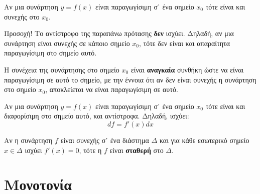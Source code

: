 \begin{prop}
  Αν μια συνάρτηση $ y=f(x) $ είναι παραγωγίσιμη σ᾽ ένα σημείο $ x_{0} $ τότε είναι 
  και συνεχής στο $ x_{0} $.
\end{prop}

\begin{rem}
\item{}
  \begin{myitemize}
    \item Προσοχή! Το αντίστροφο της παραπάνω πρότασης \textbf{δεν} ισχύει. 
      Δηλαδή, αν μια συνάρτηση είναι συνεχής σε κάποιο σημείο $ x_{0} $, 
      τότε δεν είναι και απαραίτητα παραγωγίσιμη στο σημείο αυτό.
    \item Η συνέχεια της συνάρτησης στο σημείο $ x_{0} $ είναι \textbf{αναγκαία} 
      συνθήκη ώστε να είναι παραγωγίσιμη σε αυτό το σημείο, με την έννοια ότι 
      αν δεν είναι συνεχής η συνάρτηση στο σημείο $ x_{0} $, αποκλείεται να είναι 
      παραγωγίσιμη σε αυτό.
  \end{myitemize}
\end{rem}

\begin{prop}
  Αν μια συνάρτηση $ y=f(x) $ είναι παραγωγίσιμη σ᾽ ένα σημείο $ x_{0} $ τότε είναι 
  και διαφορίσιμη στο σημείο αυτό, και αντίστροφα. Δηλαδή, ισχύει:
  \[
    df  = f'(x) dx 
  \] 
\end{prop}

\begin{prop}
  Αν η συνάρτηση $f$ είναι συνεχής σ᾽ ένα διάστημα $\Delta$ και για κάθε εσωτερικό 
  σημείο $x \in \Delta$ ισχύει $ f'(x)=0 $, τότε η $f$ είναι \textbf{σταθερή} στο 
  $\Delta$. 
\end{prop}

\section*{Μονοτονία}

